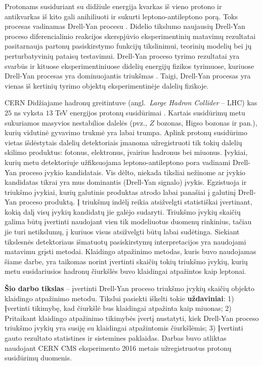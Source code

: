 \documentclass[a4paper, 12pt, oneside]{article}
\begin{document}
Protonams susiduriant su didžiule energija kvarkas iš vieno protono ir antikvarkas iš kito gali anihiliuoti
ir sukurti leptono-antileptono porą.
Toks procesas vadinamas Drell-Yan procesu \cite{DYoriginal}.
Didelio tikslumo naujausių Drell-Yan proceso diferencialinio reakcijos skerspjūvio eksperimentinių matavimų
rezultatai \cite{DY_CMS2011, DY_CMS2013, DY_ATLAS2013, DY_ATLAS2014, DY_CMS2015, DY_ATLAS2016, DY_ATLAS2017, DY_CMS2019}
pasitarnauja partonų pasiskirstymo funkcijų tikslinimui, teorinių modelių bei jų perturbatyvinių pataisų testavimui.
Drell-Yan proceso tyrimo rezultatai yra svarbūs ir kituose eksperimentiniuose didelių energijų fizikos
tyrimuose, kuriuose Drell-Yan procesas yra dominuojantis triukšmas \cite{Higgs2018, Zprime, SUSYtau}.
Taigi, Drell-Yan procesas yra vienas iš  kertinių tyrimo objektų eksperimentinėje dalelių fizikoje.

CERN Didžiajame hadronų greitintuve (angl.\ \textit{Large Hadron Collider} -- LHC) kas $25$ ns vyksta $13$ TeV
energijos protonų susidūrimai \cite{LHC_13TeV_25ns}.
Kartais susidūrimų metu sukuriamos masyvios nestabilios dalelės (pvz., $Z$ bozonas, Higso bozonas ir pan.),
kurių vidutinė gyvavimo trukmė yra labai trumpa.
Aplink protonų susidūrimo vietas išdėstytais dalelių detektoriais įmanoma užregistruoti tik tokių
dalelių skilimo produktus: fotonus, elektronus, įvairius hadronus bei miuonus.
Įvykiai, kurių metu detektoriuje užfiksuojama leptono-antileptono pora vadinami Drell-Yan proceso įvykio kandidatais.
Vis dėlto, niekada tiksliai nežinome ar įvykio kandidatas tikrai yra mus dominantis (Drell-Yan signalo) įvykis.
Egzistuoja ir triukšmo įvykiai, kurių galutinis produktas atrodo labai panašiai į galutinį Drell-Yan proceso produktą.
Į triukšmų indėlį reikia atsižvelgti statistiškai įvertinant, kokią dalį visų įvykių kandidatų jie galėjo sudaryti.
Triukšmo įvykių skaičių galima būtų įvertinti naudojant vien tik modeliuotus duomenų rinkinius, tačiau jie turi
netikslumų, į kuriuos visus atsižvelgti būtų labai sudėtinga.
Siekiant tikslesnės detektoriaus išmatuotų pasiskirstymų interpretacijos yra naudojami matavimu grįsti metodai.
Klaidingo atpažinimo metodas, kuris buvo naudojamas šiame darbe, yra taikomas norint įvertinti skaičių tokių triukšmo
įvykių, kurių metu susidariusios hadronų čiurkšlės buvo klaidingai atpažintos kaip leptonai.


\textbf{Šio darbo tikslas} -- įvertinti Drell-Yan proceso triukšmo įvykių skaičių objekto klaidingo atpažinimo metodu.
Tikslui pasiekti iškelti tokie \textbf{uždaviniai}:
1) Įvertinti tikimybę, kad čiurkšlė bus klaidingai atpažinta kaip miuonas;
2) Pritaikant klaidingo atpažinimo tikimybės įvertį nustatyti, kiek Drell-Yan proceso triukšmo įvykių yra susiję su
klaidingai atpažintomis čiurkšlėmis;
3) Įvertinti gauto rezultato statistines ir sistemines paklaidas.
Darbas buvo atliktas naudojant CERN CMS eksperimento 2016 metais užregistruotus protonų susidūrimų duomenis.
\end{document}
